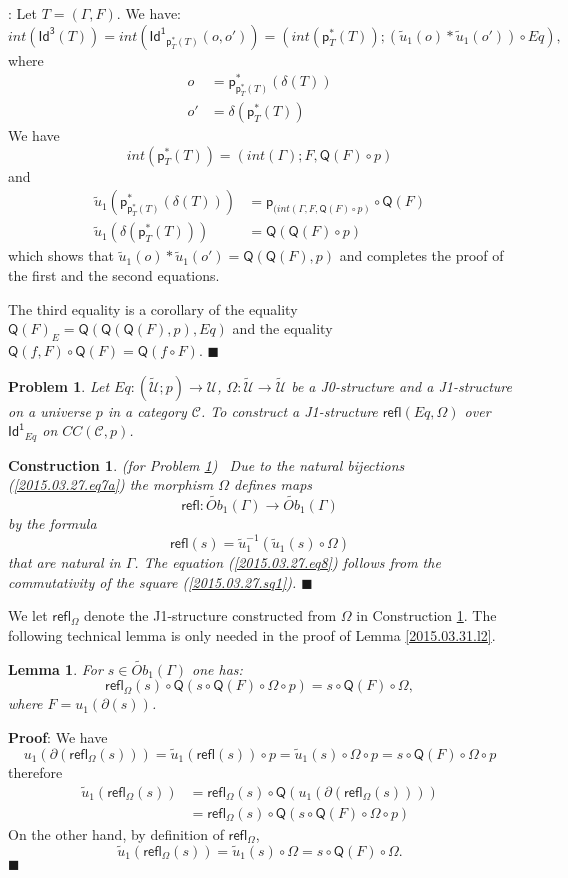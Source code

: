 \documentclass[12pt]{article}
\numberwithin{equation}{section}
\newenvironment{myproof}{{\bf Proof}:}{$\blacksquare$ \vskip 5mm }
\newtheorem{lemma}[proposition]{Lemma}
\newtheorem{problem}[proposition]{Problem}
\newtheorem{construction0}[proposition]{Construction}
\newenvironment{construction}[1]{\begin{construction0}(for Problem \ref{#1})\ }{$\blacksquare$ \end{construction0}}
\newcommand{\llabel}[1]{\label{#1}}
\newcommand{\sr}{\rightarrow}
\newcommand{\wt}{\widetilde}
\newcommand{\toCC}{CC} %
\newcommand{\p}{\mathsf{p}}
\newcommand{\Id}{\mathsf{Id^1}} %
\newcommand{\Idx}{\mathsf{Id^3}} %
\newcommand{\refl}{\mathsf{refl}}
\newcommand{\U}{\mathcal{U}}
\newcommand{\Q}{\mathsf{Q}}
\begin{document}
%
\begin{myproof}
Let $T=(\Gamma,F)$. We have:
%
$$int(\Idx(T))=int(\Id_{\p_T^*(T)}(o,o'))=(int(\p_T^*(T));(\wt{u}_1(o)*\wt{u}_1(o'))\circ
Eq),$$
%
where
%
\begin{align*}
  o &=\p_{\p_T^*(T)}^*(\delta(T)) \\
  o'&=\delta(\p_T^*(T))
\end{align*}
%
We have
%
$$int(\p_T^*(T))=(int(\Gamma);F,\Q(F)\circ p)$$
%
and
%
\begin{align*}
  \wt{u}_1(\p_{\p_T^*(T)}^*(\delta(T)))&=\p_{(int(\Gamma,F, \Q(F)\circ p)}\circ \Q(F) \\
  \wt{u}_1(\delta(\p_T^*(T)))&=\Q(\Q(F)\circ p)
\end{align*}
%
which shows that $\wt{u}_1(o)*\wt{u}_1(o')=\Q(\Q(F),p)$ and completes the proof
of the first and the second equations.

The third equality is a corollary of the equality $\Q(F)_{E}=\Q(\Q(\Q(F),p),Eq)$
and the equality $\Q(f,F)\circ \Q(F)=\Q(f\circ F)$.
\end{myproof}
%
\begin{problem}
\llabel{2015.03.27.prob4} Let $Eq:(\wt{\U};p)\sr \U$, $\Omega:\wt{\U}\sr \wt{\U}$
be a J0-structure and a J1-structure on a universe $p$ in a category $\mathcal C$.
To construct a J1-structure $\refl(Eq,\Omega)$ over $\Id_{Eq}$ on $\toCC({\mathcal C},p)$.
\end{problem}
%
\begin{construction}{2015.03.27.prob4}\rm
\llabel{2015.03.27.constr4} Due to the natural bijections
(\ref{2015.03.27.eq7a}) the morphism $\Omega$ defines maps
%
$$\refl:\wt{Ob}_1(\Gamma)\sr \wt{Ob}_1(\Gamma)$$
%
by the formula
%
$$\refl(s)=\wt{u}_1^{-1}(\wt{u}_1(s)\circ \Omega)$$
%
that are natural in $\Gamma$. The equation (\ref{2015.03.27.eq8}) follows from
the commutativity of the square (\ref{2015.03.27.sq1}).
\end{construction}
%
We let $\refl_{\Omega}$ denote the J1-structure constructed from $\Omega$ in
Construction \ref{2015.03.27.constr4}.
%
The following technical lemma is only needed in the proof of Lemma
\ref{2015.03.31.l2}.
%
\begin{lemma}
\llabel{2015.04.02.l3} For $s\in \wt{Ob}_1(\Gamma)$ one has:
%
$$\refl_{\Omega}(s)\circ \Q(s\circ \Q(F)\circ \Omega\circ p)=s\circ \Q(F)\circ
\Omega,$$
%
where $F=u_1(\partial(s))$.
\end{lemma}
%
\begin{myproof}
We have
%
$$u_1(\partial(\refl_{\Omega}(s)))=\wt{u}_1(\refl(s))\circ p=\wt{u}_1(s)\circ
\Omega\circ p=s\circ \Q(F)\circ \Omega\circ p$$
%
therefore
%
\begin{align*}
  \wt{u}_1(\refl_{\Omega}(s))
  & =\refl_{\Omega}(s)\circ \Q(u_1(\partial(\refl_{\Omega}(s)))) \\
  & = \refl_{\Omega}(s)\circ \Q(s\circ \Q(F)\circ \Omega\circ p)
\end{align*}
%
On the other hand, by definition of $\refl_{\Omega}$,
%
$$\wt{u}_1(\refl_{\Omega}(s))=\wt{u}_1(s)\circ \Omega=s\circ \Q(F)\circ \Omega.$$
%
\end{myproof}
\end{document}
